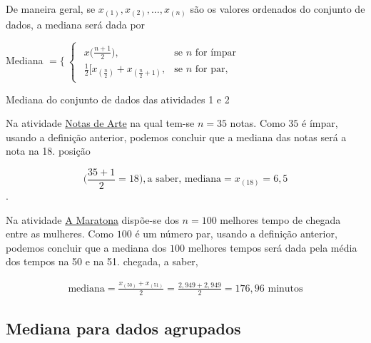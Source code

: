 De maneira geral, se \(x_{(1)},x_{(2)},...,x_{(n)}\) são os valores ordenados do conjunto de dados, a mediana será dada por

Mediana $=\{\
\begin{cases}
\begin{array}{ll}
x\big(\frac{n+1}{2}\big), &\text{se $n$ for ímpar}\\
\frac{1}{2}\big[x_{(\frac{n}{2})}+x_{(\frac{n}{2}+1)}, &\text{se $n$ for par},
\end{array}
\end{cases}
$


\begin{example}{Mediana do conjunto de dados das atividades 1 e 2}

Na atividade \hyperref[\detokenize{PE104-0:ativ-notas-de-artes}]{Notas de Arte} na qual tem-se \(n=35\) notas. Como $35$ é ímpar, usando a definição anterior, podemos concluir que a mediana das notas será a nota na 18. posição

\begin{equation*}
\bigg(\frac{35+1}{2}=18\bigg), \text{a saber, mediana}=x_{(18)}=6{,}5
\end{equation*}.

Na atividade \hyperref[\detokenize{PE104-0:ativ-maratona-de-ny}]{A Maratona} dispõe-se dos \(n=100\) melhores tempo de chegada entre as mulheres. Como $100$ é um número par, usando a definição anterior, podemos concluir que a mediana dos $100$ melhores tempos será dada pela média dos tempos na 50 e na 51. chegada, a saber,


\begin{equation*}
\begin{split}\text{mediana}=\frac{x_{(50)}+x_{(51)}}{2}=\frac{2,949+2,949}{2}=176,96 \text{ minutos}\end{split}
\end{equation*}
\end{example}

\subsection{Mediana  para dados agrupados}

